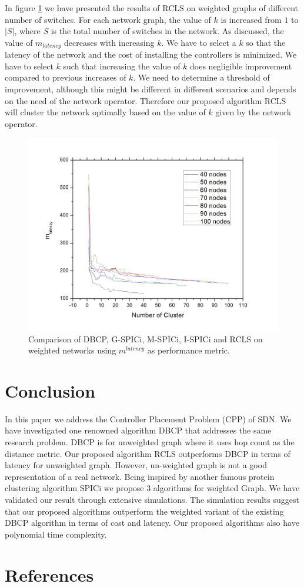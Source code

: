 \documentclass[a4paper,twocolumn,preprint]{elsarticle}
\begin{document}
In figure \ref{fig:kanalysis} we have presented the results of RCLS on weighted graphs of different number of switches. For each network graph, the value of $k$ is increased from $1$ to $|S|$, where $S$ is the total number of switches in the network. As discussed, the value of $m_{latency}$ decreases with increasing $k$. We have to select a $k$ so that the latency of the network and the cost of installing the controllers is minimized. We have to select $k$ such that increasing the value of $k$ does negligible improvement compared to previous increases of $k$. We need to determine a threshold of improvement, although this might be different in different scenarios and depends on the need of the network operator. Therefore our proposed algorithm RCLS will cluster the network optimally based on the value of $k$ given by the network operator.

\begin{figure}
	\includegraphics[width=\linewidth]{kanalysis.jpg}
	\caption{Comparison of DBCP, G-SPICi, M-SPICi, I-SPICi and RCLS on weighted networks using $m^{latency}$ as performance metric.}
	\label{fig:kanalysis}
\end{figure}


\section{Conclusion} \label {conclusion}
In this paper we address the Controller Placement Problem (CPP) of SDN. We have investigated one renowned algorithm DBCP \cite{dbcp2017} that addresses the same research problem. DBCP is for unweighted graph where it uses hop count as the distance metric. Our proposed algorithm RCLS outperforms DBCP in terms of latency for unweighted graph. However, un-weighted graph is not a good representation of a real network. Being inspired by another famous protein clustering algorithm SPICi \cite{spici2010} we propose 3 algorithms for weighted Graph. We have validated our result through extensive simulations. The simulation results suggest that our proposed algorithms outperform the weighted variant of the existing DBCP algorithm in terms of cost and latency. Our proposed algorithms also have polynomial time complexity.
\section*{References}


\end{document}
